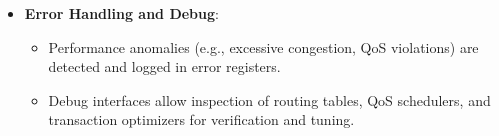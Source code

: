 \documentclass[11pt,a4paper]{article}
\begin{document}
\begin{itemize}
\begin{itemize}
    \end{itemize}
    \item \textbf{Error Handling and Debug}:
    \begin{itemize}
        \item Performance anomalies (e.g., excessive congestion, QoS violations) are detected and logged in error registers.
        \item Debug interfaces allow inspection of routing tables, QoS schedulers, and transaction optimizers for verification and tuning.
    \end{itemize}
\end{itemize}
\end{document}
